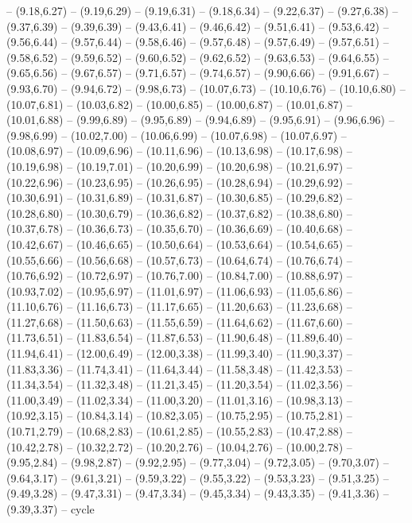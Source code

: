 {-- (9.18,6.27) -- (9.19,6.29) -- (9.19,6.31) -- (9.18,6.34) -- (9.22,6.37) -- (9.27,6.38) -- (9.37,6.39) -- (9.39,6.39) -- (9.43,6.41) -- (9.46,6.42) -- (9.51,6.41) -- (9.53,6.42) -- (9.56,6.44) -- (9.57,6.44) -- (9.58,6.46) -- (9.57,6.48) -- (9.57,6.49) -- (9.57,6.51) -- (9.58,6.52) -- (9.59,6.52) -- (9.60,6.52) -- (9.62,6.52) -- (9.63,6.53) -- (9.64,6.55) -- (9.65,6.56) -- (9.67,6.57) -- (9.71,6.57) -- (9.74,6.57) -- (9.90,6.66) -- (9.91,6.67) -- (9.93,6.70) -- (9.94,6.72) -- (9.98,6.73) -- (10.07,6.73) -- (10.10,6.76) -- (10.10,6.80) -- (10.07,6.81) -- (10.03,6.82) -- (10.00,6.85) -- (10.00,6.87) -- (10.01,6.87) -- (10.01,6.88) -- (9.99,6.89) -- (9.95,6.89) -- (9.94,6.89) -- (9.95,6.91) -- (9.96,6.96) -- (9.98,6.99) -- (10.02,7.00) -- (10.06,6.99) -- (10.07,6.98) -- (10.07,6.97) -- (10.08,6.97) -- (10.09,6.96) -- (10.11,6.96) -- (10.13,6.98) -- (10.17,6.98) -- (10.19,6.98) -- (10.19,7.01) -- (10.20,6.99) -- (10.20,6.98) -- (10.21,6.97) -- (10.22,6.96) -- (10.23,6.95) -- (10.26,6.95) -- (10.28,6.94) -- (10.29,6.92) -- (10.30,6.91) -- (10.31,6.89) -- (10.31,6.87) -- (10.30,6.85) -- (10.29,6.82) -- (10.28,6.80) -- (10.30,6.79) -- (10.36,6.82) -- (10.37,6.82) -- (10.38,6.80) -- (10.37,6.78) -- (10.36,6.73) -- (10.35,6.70) -- (10.36,6.69) -- (10.40,6.68) -- (10.42,6.67) -- (10.46,6.65) -- (10.50,6.64) -- (10.53,6.64) -- (10.54,6.65) -- (10.55,6.66) -- (10.56,6.68) -- (10.57,6.73) -- (10.64,6.74) -- (10.76,6.74) -- (10.76,6.92) -- (10.72,6.97) -- (10.76,7.00) -- (10.84,7.00) -- (10.88,6.97) -- (10.93,7.02) -- (10.95,6.97) -- (11.01,6.97) -- (11.06,6.93) -- (11.05,6.86) -- (11.10,6.76) -- (11.16,6.73) -- (11.17,6.65) -- (11.20,6.63) -- (11.23,6.68) -- (11.27,6.68) -- (11.50,6.63) -- (11.55,6.59) -- (11.64,6.62) -- (11.67,6.60) -- (11.73,6.51) -- (11.83,6.54) -- (11.87,6.53) -- (11.90,6.48) -- (11.89,6.40) -- (11.94,6.41) -- (12.00,6.49) -- (12.00,3.38) -- (11.99,3.40) -- (11.90,3.37) -- (11.83,3.36) -- (11.74,3.41) -- (11.64,3.44) -- (11.58,3.48) -- (11.42,3.53) -- (11.34,3.54) -- (11.32,3.48) -- (11.21,3.45) -- (11.20,3.54) -- (11.02,3.56) -- (11.00,3.49) -- (11.02,3.34) -- (11.00,3.20) -- (11.01,3.16) -- (10.98,3.13) -- (10.92,3.15) -- (10.84,3.14) -- (10.82,3.05) -- (10.75,2.95) -- (10.75,2.81) -- (10.71,2.79) -- (10.68,2.83) -- (10.61,2.85) -- (10.55,2.83) -- (10.47,2.88) -- (10.42,2.78) -- (10.32,2.72) -- (10.20,2.76) -- (10.04,2.76) -- (10.00,2.78) -- (9.95,2.84) -- (9.98,2.87) -- (9.92,2.95) -- (9.77,3.04) -- (9.72,3.05) -- (9.70,3.07) -- (9.64,3.17) -- (9.61,3.21) -- (9.59,3.22) -- (9.55,3.22) -- (9.53,3.23) -- (9.51,3.25) -- (9.49,3.28) -- (9.47,3.31) -- (9.47,3.34) -- (9.45,3.34) -- (9.43,3.35) -- (9.41,3.36) -- (9.39,3.37) -- cycle}
